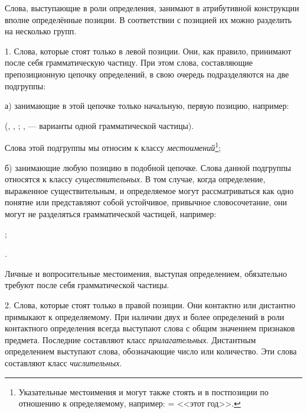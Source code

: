 Слова, выступающие в роли определения, занимают в атрибутивной конструкции вполне определённые позиции. В соответствии с позицией их можно разделить на несколько групп.

1. Слова, которые стоят только в левой позиции. Они, как правило, принимают после себя грамматическую частицу. При этом слова, составляющие препозиционную цепочку определений, в свою очередь подразделяются на две подгруппы:

а) занимающие в этой цепочке только начальную, первую позицию, например:
\begin{prfsample}
    \item {} (, , ; ,  --- варианты одной грамматической частицы).
\end{prfsample}
Слова этой подгруппы мы относим к классу \emph{местоимений}\footnote[24]{Указательные местоимения  и  могут также стоять и в постпозиции по отношению к определяемому, например:  =  <<этот год>>.};

б) занимающие любую позицию в подобной цепочке. Слова данной подгруппы относятся к классу \emph{существительных}. В том случае, когда определение, выраженное существительным, и определяемое могут рассматриваться как одно понятие или представляют собой устойчивое, привычное словосочетание, они могут не разделяться грамматической частицей, например:
\begin{prfsample}
    \item {};
    \item {}.    
\end{prfsample}
Личные и вопросительные местоимения, выступая определением, обязательно требуют после себя грамматической частицы.

2. Слова, которые стоят только в правой позиции. Они контактно или дистантно примыкают к определяемому. При наличии двух и более определений в роли контактного определения всегда выступают слова с общим значением признаков предмета. Последние составляют класс \emph{прилагательных}. Дистантным определением выступают слова, обозначающие число или количество. Эти слова составляют класс \emph{числительных}.

